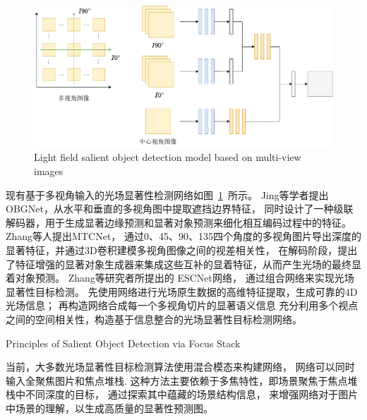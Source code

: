 

\begin{figure}[t]
	\centering
	\includegraphics[width=0.85\linewidth]{figures/chapter2/multi_images_fssod}
	{Light field salient object detection model based on multi-view images}  
	\label{chpt2:figure:model_of_multi_inputs}
\end{figure}




现有基于多视角输入的光场显著性检测网络如图~\ref{chpt2:figure:model_of_multi_inputs}~所示。
Jing等学者提出OBGNet，从水平和垂直的多视角图中提取遮挡边界特征，
同时设计了一种级联解码器，用于生成显著边缘预测和显著对象预测来细化相互编码过程中的特征。
Zhang等人提出MTCNet，
通过0、45、90、135四个角度的多视角图片导出深度的显著特征，并通过3D卷积建模多视角图像之间的视差相关性，
在解码阶段，提出了特征增强的显著对象生成器来集成这些互补的显着特征，从而产生光场的最终显着对象预测。
Zhang等研究者所提出的 ESCNet网络，
通过组合网络来实现光场显著性目标检测。
先使用网络进行光场原生数据的高维特征提取，生成可靠的4D光场信息；
再构造网络合成每一个多视角切片的显著语义信息
充分利用多个视点之间的空间相关性，构造基于信息整合的光场显著性目标检测网络。









{Principles of Salient Object Detection via Focus Stack}

  
当前，大多数光场显著性目标检测算法使用混合模态来构建网络，
网络可以同时输入全聚焦图片和焦点堆栈.
这种方法主要依赖于多焦特性，即场景聚焦于焦点堆栈中不同深度的目标，
通过探索其中蕴藏的场景结构信息，
来增强网络对于图片中场景的理解，以生成高质量的显著性预测图。



